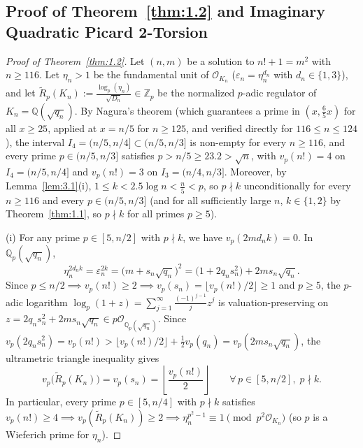 \documentclass[11pt,reqno]{amsart}
\theoremstyle{remark}
\numberwithin{equation}{section}
\newcommand{\Z}{\mathbb{Z}}
\newcommand{\Q}{\mathbb{Q}}
\begin{document}
\subsection{Proof of Theorem~\ref{thm:1.2} and Imaginary Quadratic Picard 2-Torsion}

\begin{proof}[Proof of Theorem~\ref{thm:1.2}]
Let $(n, m)$ be a solution to $n! + 1 = m^2$ with $n \ge 116$. Let $\eta_n > 1$ be the fundamental unit of $\mathcal{O}_{K_n}$ ($\varepsilon_n = \eta_n^{d_n}$ with $d_n \in \{1, 3\}$), and let $\widetilde{R}_p(K_n) := \frac{\log_p(\eta_n)}{\sqrt{D_n}} \in \Z_p$ be the normalized $p$-adic regulator of $K_n = \Q(\sqrt{q_n})$. By Nagura's theorem \cite{Nagura1952} (which guarantees a prime in $(x, \frac{6}{5}x)$ for all $x \ge 25$, applied at $x = n/5$ for $n \ge 125$, and verified directly for $116 \le n \le 124$), the interval $I_4 = (n/5, n/4] \subset (n/5, n/3]$ is non-empty for every $n \ge 116$, and every prime $p \in (n/5, n/3]$ satisfies $p > n/5 \ge 23.2 > \sqrt{n}$, with $v_p(n!) = 4$ on $I_4 = (n/5, n/4]$ and $v_p(n!) = 3$ on $I_3 = (n/4, n/3]$. Moreover, by Lemma~\ref{lem:3.1}(i), $1 \le k < 2.5\log n < \frac{n}{5} < p$, so $p \nmid k$ unconditionally for every $n \ge 116$ and every $p \in (n/5, n/3]$ (and for all sufficiently large $n$, $k \in \{1, 2\}$ by Theorem~\ref{thm:1.1}, so $p \nmid k$ for all primes $p \ge 5$).

(i) For any prime $p \in [5, n/2]$ with $p \nmid k$, we have $v_p(2m d_n k) = 0$. In $\Q_p(\sqrt{q_n})$,
\[
\eta_n^{2d_n k} = \varepsilon_n^{2k} = \bigl(m + s_n\sqrt{q_n}\bigr)^2 = \bigl(1 + 2q_n s_n^2\bigr) + 2ms_n\sqrt{q_n}.
\]
Since $p \le n/2 \implies v_p(n!) \ge 2 \implies v_p(s_n) = \lfloor v_p(n!)/2 \rfloor \ge 1$ and $p \ge 5$, the $p$-adic logarithm $\log_p(1 + z) = \sum_{j=1}^\infty \frac{(-1)^{j-1}}{j}z^j$ is valuation-preserving on $z = 2q_n s_n^2 + 2ms_n\sqrt{q_n} \in p\mathcal{O}_{\Q_p(\sqrt{q_n})}$. Since $v_p(2q_n s_n^2) = v_p(n!) > \lfloor v_p(n!)/2 \rfloor + \frac{1}{2}v_p(q_n) = v_p(2ms_n\sqrt{q_n})$, the ultrametric triangle inequality gives
\begin{equation}\label{eq:3.6}
v_p\bigl(\widetilde{R}_p(K_n)\bigr) = v_p(s_n) = \left\lfloor \frac{v_p(n!)}{2} \right\rfloor \qquad \forall\, p \in [5, n/2],\; p \nmid k.
\end{equation}
In particular, every prime $p \in [5, n/4]$ with $p \nmid k$ satisfies $v_p(n!) \ge 4 \implies v_p(\widetilde{R}_p(K_n)) \ge 2 \implies \eta_n^{p^2-1} \equiv 1 \pmod{p^2\mathcal{O}_{K_n}}$ (so $p$ is a Wieferich prime for $\eta_n$).


\end{proof}
\end{document}
